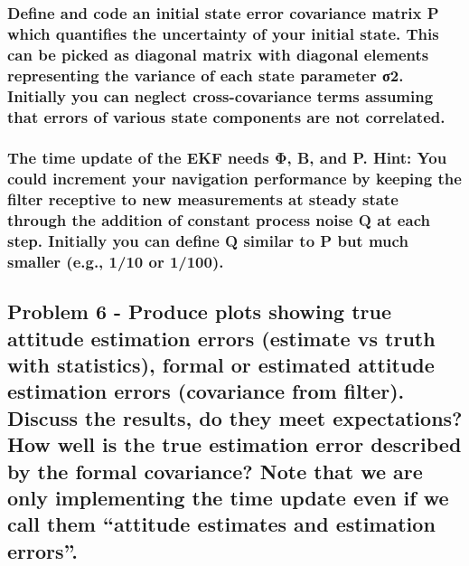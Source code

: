 \subsubsection{Define and code an initial state error covariance matrix P which quantifies the uncertainty of your initial state. This can be picked as diagonal matrix with diagonal elements representing the variance of each state parameter σ2. Initially you can neglect cross-covariance terms assuming that errors of various state components are not correlated.}

\subsubsection{The time update of the EKF needs Φ, B, and P. Hint: You could increment your navigation performance by keeping the filter receptive to new measurements at steady state through the addition of constant process noise Q at each step. Initially you can define Q similar to P but much smaller (e.g., 1/10 or 1/100).}

\subsection{Problem 6 - Produce plots showing true attitude estimation errors (estimate vs truth with statistics), formal or estimated attitude estimation errors (covariance from filter). Discuss the results, do they meet expectations? How well is the true estimation error described by the formal covariance? Note that we are only implementing the time update even if we call them “attitude estimates and estimation errors”.}